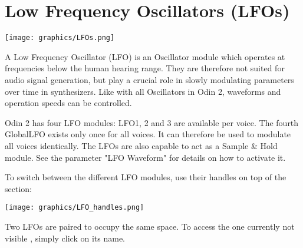 
\section{Low Frequency Oscillators (LFOs)}
\label{LFOs}

\begin{center}
    \texttt{[image: graphics/LFOs.png]}
\end{center}

A Low Frequency Oscillator (LFO) is an Oscillator module which operates at frequencies below the human hearing range. They are therefore not suited for audio signal generation, but play a crucial role in slowly modulating parameters over time in synthesizers. Like with all Oscillators in Odin 2, waveforms and operation speeds can be controlled.

Odin 2 has four LFO modules: LFO1, 2 and 3 are available per voice. The fourth GlobalLFO exists only once for all voices. It can therefore be used to modulate all voices identically. The LFOs are also capable to act as a Sample \& Hold module. See the parameter "LFO Waveform" for details on how to activate it.

To switch between the different LFO modules, use their handles on top of the section:
\begin{center}
    \texttt{[image: graphics/LFO\_handles.png]}
\end{center}
Two LFOs are paired to occupy the same space. To access the one currently not visible , simply click on its name.


